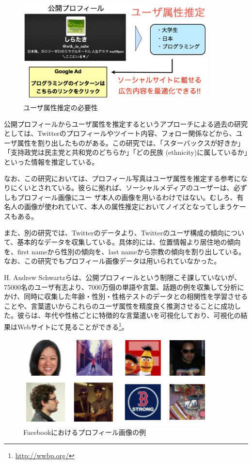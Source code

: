 \begin{figure}[tbp]
 \begin{center}
  \includegraphics[width=100mm]{img/c6/prof2prop}
 \end{center}
 \caption{ユーザ属性推定の必要性}
 \label{c6_prof2prop}
\end{figure}

公開プロフィールからユーザ属性を推定するというアプローチによる過去の研究としては、Twitterのプロフィールやツイート内容、フォロー関係などから、ユーザ属性を割り出したものがある\cite{pennacchiotti2011a-machine}。この研究では、「スターバックスが好きか」「支持政党は民主党と共和党のどちらか」「どの民族 (ethnicity)に属しているか」といった情報を推定している。\par
なお、この研究においては、プロフィール写真はユーザ属性を推定する参考になりにくいとされている。彼らに拠れば、ソーシャルメディアのユーザーは、必ずしもプロフィール画像にユー
ザ本人の画像を用いるわけではない。むしろ、有名人の画像が使われていて、本人の属性推定においてノイズとなってしまうケースもある。\par
また、別の研究\cite{mislove2011understanding}では、Twitterのデータより、Twitterのユーザ構成の傾向について、基本的なデータを収集している。具体的には、位置情報より居住地の傾向を、first nameから性別の傾向を、last nameから宗教の傾向を割り出している。なお、この研究でもプロフィール画像データは用いられていなかった。\par
H. Andrew Schwartzらは、公開プロフィールという制限こそ課していないが、75000名のユーザ有志より、7000万個の単語や言葉、話題の例を収集して分析にかけ、同時に収集した年齢・性別・性格テストのデータとの相関性を学習させることや、言葉遣いからこれらのユーザ属性を精度良く推測させることに成功した\cite{schwartz2013personality}。彼らは、年代や性格ごとに特徴的な言葉遣いを可視化しており、可視化の結果はWebサイトにて見ることができる\footnote{\url{http://wwbp.org/}}。

\begin{figure}[tbp]
 \begin{center}
  \includegraphics[width=100mm]{img/c6/pic_sample}
 \end{center}
 \caption{Facebookにおけるプロフィール画像の例}
 \label{c6_pic_sample}
\end{figure}

